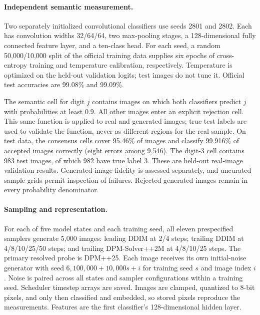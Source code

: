 \paragraph{Independent semantic measurement.}
Two separately initialized convolutional classifiers use seeds 2801 and 2802.
Each has convolution widths 32/64/64, two max-pooling stages, a 128-dimensional
fully connected feature layer, and a ten-class head. For each seed, a random
50,000/10,000 split of the official training data supplies six epochs of
cross-entropy training and temperature calibration, respectively. Temperature
is optimized on the held-out validation logits; test images do not tune it.
Official test accuracies are 99.08\% and 99.09\%.

The semantic cell for digit $j$ contains images on which both classifiers
predict $j$ with probabilities at least 0.9. All other images enter an explicit
rejection cell. This same function is applied to real and generated images;
true test labels are used to validate the function, never as different regions
for the real sample. On test data, the consensus cells cover 95.46\% of images
and classify 99.916\% of accepted images correctly (eight errors among 9,546).
The digit-3 cell contains 983 test images, of which 982 have true label 3.
These are held-out real-image validation results. Generated-image fidelity is
assessed separately, and uncurated sample grids permit inspection of failures.
Rejected generated images remain in every probability denominator.

\paragraph{Sampling and representation.}
For each of five model states and each training seed, all eleven prespecified
samplers generate 5,000 images: leading DDIM at 2/4 steps; trailing DDIM at
4/8/10/25/50 steps; and trailing DPM-Solver++2M at 4/8/10/25 steps. The primary
resolved probe is DPM++25. Each image receives its own initial-noise generator
with seed $6{,}100{,}000+10{,}000s+i$ for training seed $s$ and image index $i$.
Noise is paired across all states and sampler configurations within a training
seed. Scheduler timestep arrays are saved. Images are clamped, quantized to
8-bit pixels, and only then classified and embedded, so stored pixels reproduce
the measurements. Features are the first classifier's 128-dimensional hidden
layer.

